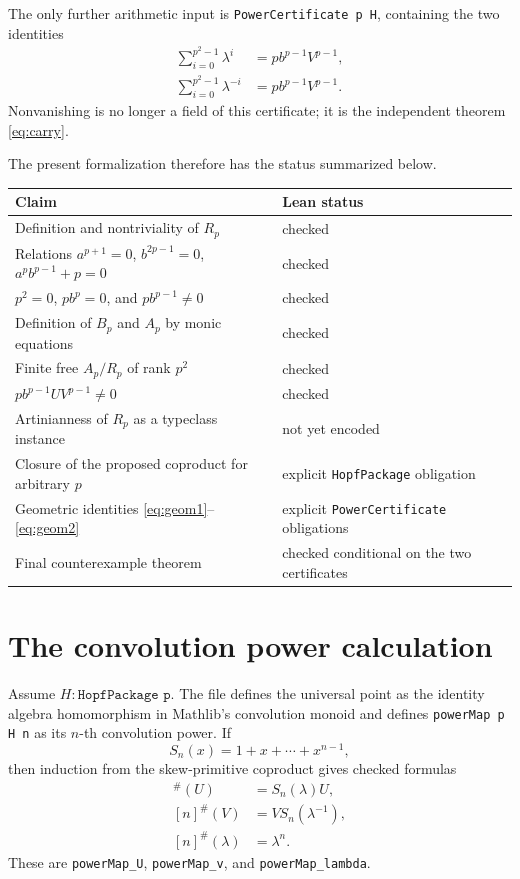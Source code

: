 \documentclass[11pt]{article}
\begin{document}
The only further arithmetic input is
\texttt{PowerCertificate p H}, containing the two identities
\begin{align}
 \sum_{i=0}^{p^2-1}\lambda^i
   &=p b^{p-1}V^{p-1},\label{eq:geom1}\\
 \sum_{i=0}^{p^2-1}\lambda^{-i}
   &=p b^{p-1}V^{p-1}.
 \label{eq:geom2}
\end{align}
Nonvanishing is no longer a field of this certificate; it is the independent
theorem \eqref{eq:carry}.

The present formalization therefore has the status summarized below.
\begin{center}
\begin{tabular}{@{}p{}p{}@{}}
\toprule
Claim & Lean status\\
\midrule
Definition and nontriviality of $R_p$ & checked\\
Relations $a^{p+1}=0$, $b^{2p-1}=0$, $a^pb^{p-1}+p=0$ & checked\\
$p^2=0$, $pb^p=0$, and $pb^{p-1}\neq0$ & checked\\
Definition of $B_p$ and $A_p$ by monic equations & checked\\
Finite free $A_p/R_p$ of rank $p^2$ & checked\\
$pb^{p-1}UV^{p-1}\neq0$ & checked\\
Artinianness of $R_p$ as a typeclass instance & not yet encoded\\
Closure of the proposed coproduct for arbitrary $p$ & explicit
  \texttt{HopfPackage} obligation\\
Geometric identities \eqref{eq:geom1}--\eqref{eq:geom2} & explicit
  \texttt{PowerCertificate} obligations\\
Final counterexample theorem & checked conditional on the two certificates\\
\bottomrule
\end{tabular}
\end{center}

\section{The convolution power calculation}

Assume $H:\texttt{HopfPackage p}$.  The file defines the universal point as
the identity algebra homomorphism in Mathlib's convolution monoid and defines
\texttt{powerMap p H n} as its $n$-th convolution power.  If
\[
 S_n(x)=1+x+\cdots+x^{n-1},
\]
then induction from the skew-primitive coproduct gives checked formulas
\begin{align}
 [n]^\#(U)&=S_n(\lambda)U,\label{eq:powerU}\\
 [n]^\#(V)&=V S_n(\lambda^{-1}),\label{eq:powerV}\\
 [n]^\#(\lambda)&=\lambda^n.
\end{align}
These are \texttt{powerMap\_U}, \texttt{powerMap\_v}, and
\texttt{powerMap\_lambda}.
\end{document}
